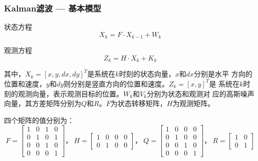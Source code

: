 \documentclass[xcolor=svgnames,serif,table]{beamer}
\begin{document}
\begin{frame}[allowframebreaks]
  \frametitle{Kalman滤波 --- 基本模型}
  \begin{block}{状态方程}
    \begin{equation}
    \label{eq:state}
    X_{k}=F\cdot X_{k-1}+W_k
  \end{equation}
\end{block}

\begin{block}{观测方程}
  \begin{equation}
    \label{eq:observation}
    Z_{k}=H\cdot X_{k}+K_{k}
  \end{equation}  
\end{block}

其中，$X_k = [x,y,dx,dy]^{T}$是系统在$k$时刻的状态向量，$x$和$dx$分别是水平
方向的位置和速度，$y$和$dy$则分别是竖直方向的位置和速度。$Z_k=[x,y]^{T}$是
系统在$k$时刻的观测向量，表示观测目标的位置。$W_k$和$V_k$分别为状态和观测对
应的高斯噪声向量，其方差矩阵分别为$Q$和$R$。$F$为状态转移矩阵，$H$为观测矩阵。

四个矩阵的值分别为\cite{Zhang2009}：$$F=\begin{bmatrix}
  1 & 0 & 1 & 0\\0 & 1 & 0 & 1 \\ 0 & 0 & 1 & 0\\ 0 & 0 & 0 & 1
\end{bmatrix}
\mbox{，}~
H = \begin{bmatrix}
  1 & 0 & 0 & 0\\0 & 1 & 0 & 0
\end{bmatrix}
\mbox{，}~
Q=\begin{bmatrix}
  1 & 0 & 0 & 0\\0 & 1 & 0 & 0 \\ 0 & 0 & 1 & 0\\ 0 & 0 & 0 & 1
\end{bmatrix}
\mbox{，}~
R = \begin{bmatrix}
  1 & 0 \\0 & 1 
\end{bmatrix}
$$
\end{frame}
\end{document}
